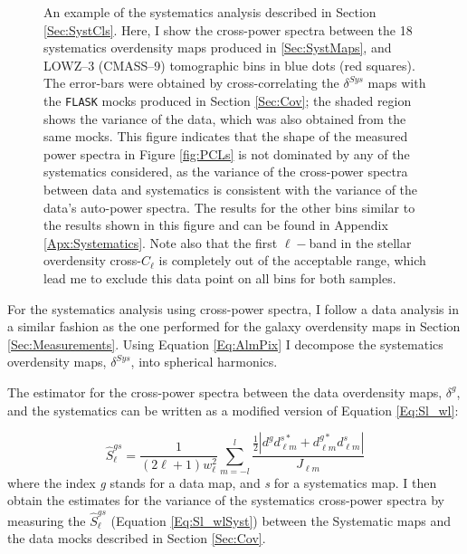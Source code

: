 \begin{figure}
\begin{center}
\caption[An example of the systematics analysis for the BOSS samples.]{An example of the systematics analysis described in Section \ref{Sec:SystCls}. Here, I show the cross-power spectra between the 18 systematics overdensity maps produced in \ref{Sec:SystMaps}, and LOWZ--3 (CMASS--9) tomographic bins in blue dots (red squares). The error-bars were obtained by cross-correlating the $\delta^{Sys}$ maps with the \texttt{FLASK} mocks produced in Section \ref{Sec:Cov}; the shaded region shows the variance of the data, which was also obtained from the same mocks. This figure indicates that the shape of the measured power spectra in Figure \ref{fig:PCLs} is not dominated by any of the systematics considered, as the variance of the cross-power spectra between data and systematics is consistent with the variance of the data's auto-power spectra. The results for the other bins similar to the results shown in this figure and can be found in Appendix \ref{Apx:Systematics}. Note also that the first $\ell-$band in the stellar overdensity cross-$C_{\ell}$ is completely out of the acceptable range, which lead me to exclude this data point on all bins for both samples.}
\label{fig:SystBin3}
\end{center}
\end{figure}
For the systematics analysis using cross-power spectra, I follow a data analysis in a similar fashion as the one performed for the galaxy overdensity maps in Section \ref{Sec:Measurements}.  Using Equation \eqref{Eq:AlmPix} I decompose the systematics overdensity maps, $\delta^{Sys}$, into spherical harmonics. 

The estimator for the cross-power spectra between the data overdensity maps, $\delta^{g}$, and the systematics can be written as a modified version of Equation \eqref{Eq:Sl_wl}:

\begin{equation}
\hat{S}^{gs}_{\ell} = \frac{1}{(2\ell+1)w_{\ell}^2}\sum_{m=-l}^l  \frac{\frac{1}{2}\left|d_{}^{g}  d_{\ell m}^{s*} + d_{\ell m}^{g*}  d_{\ell m}^{s}\right|}{J_{\ell m}}
\label{Eq:Sl_wlSyst}
\end{equation}
where the index \textit{g} stands for a data map, and \textit{s} for a systematics map. I then obtain the estimates for the variance of the systematics cross-power spectra by measuring the $\hat{S}^{gs}_{\ell}$ (Equation \eqref{Eq:Sl_wlSyst}) between the Systematic maps and the data mocks described in Section \ref{Sec:Cov}.

